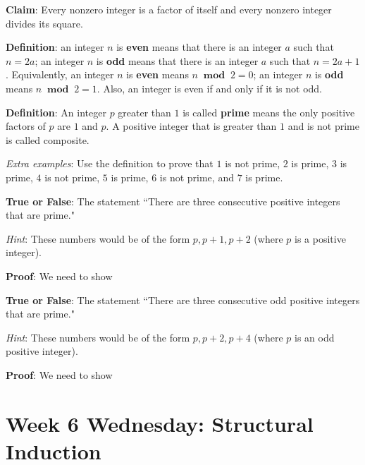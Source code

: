 \documentclass[12pt, oneside]{article}
\begin{document}
\vspace{150pt}
 

{\bf Claim}: Every nonzero integer is a factor of itself and 
every nonzero integer divides its square.

\vspace{100pt}
 

{\bf Definition}: an integer $n$ is {\bf even} means that there is an integer $a$ such that $n = 2a$; 
an integer $n$ is {\bf odd} means that there is an integer $a$ such that $n = 2a+1$.  Equivalently, 
an integer $n$ is {\bf even} means $n ~\textbf{ mod }~2 = 0$; an integer $n$ is {\bf odd} means $n ~\textbf{ mod }~2 = 1$.  
Also, an integer is even if and only if it is not odd.
 

{\bf Definition}:  An integer $p$ greater than $1$ is called {\bf prime} means 
the only positive factors of 
$p$ are $1$ and $p$. A positive integer that is greater than $1$ and is not prime 
is called composite. 

{\it Extra examples}: Use the definition to prove that $1$ is not prime, $2$ is prime, $3$
is prime, $4$ is not prime, $5$ is prime, $6$ is not prime, and $7$ is prime.


{\bf True or False}: The statement ``There are three consecutive positive integers that are prime."

{\it Hint}: These numbers would be of the form $p, p+1, p+2$ (where $p$ is a positive integer).

{\bf Proof}: We need to show \underline{}

\vspace{200pt}

{\bf True or False}: The statement ``There are three consecutive odd positive integers that are prime."

{\it Hint}: These numbers would be of the form $p, p+2, p+4$ (where $p$ is an odd positive integer).

{\bf Proof}: We need to show \underline{}

\vspace{200pt}
 \newpage


\section*{Week 6 Wednesday: Structural Induction}
\end{document}
